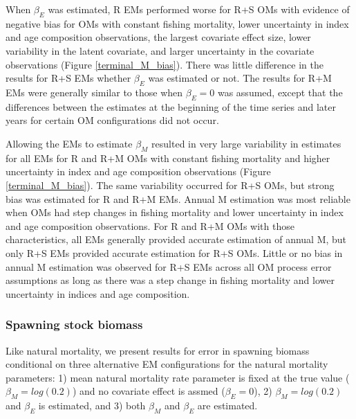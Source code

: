 \documentclass[
  12pt,
]{article}
\begin{document}
When \(\beta_E\) was estimated, R EMs performed worse for R+S OMs with evidence of negative bias for OMs with constant fishing mortality, lower uncertainty in index and age composition observations, the largest covariate effect size, lower variability in the latent covariate, and larger uncertainty in the covariate observations (Figure \ref{terminal_M_bias}). There was little difference in the results for R+S EMs whether \(\beta_E\) was estimated or not. The results for R+M EMs were generally similar to those when \(\beta_E=0\) was assumed, except that the differences between the estimates at the beginning of the time series and later years for certain OM configurations did not occur.

Allowing the EMs to estimate \(\beta_M\) resulted in very large variability in estimates for all EMs for R and R+M OMs with constant fishing mortality and higher uncertainty in index and age composition observations (Figure \ref{terminal_M_bias}). The same variability occurred for R+S OMs, but strong bias was estimated for R and R+M EMs. Annual M estimation was most reliable when OMs had step changes in fishing mortality and lower uncertainty in index and age composition observations. For R and R+M OMs with those characteristics, all EMs generally provided accurate estimation of annual M, but only R+S EMs provided accurate estimation for R+S OMs. Little or no bias in annual M estimation was observed for R+S EMs across all OM process error assumptions as long as there was a step change in fishing mortality and lower uncertainty in indices and age composition.

\hypertarget{spawning-stock-biomass}{%
\subsubsection*{Spawning stock biomass}\label{spawning-stock-biomass}}

Like natural mortality, we present results for error in spawning biomass conditional on three alternative EM configurations for the natural mortality parameters: 1) mean natural mortality rate parameter is fixed at the true value (\(\beta_M = log(0.2)\)) and no covariate effect is assmed (\(\beta_E = 0\)), 2) \(\beta_M = log(0.2)\) and \(\beta_E\) is estimated, and 3) both \(\beta_M\) and \(\beta_E\) are estimated.
\end{document}
